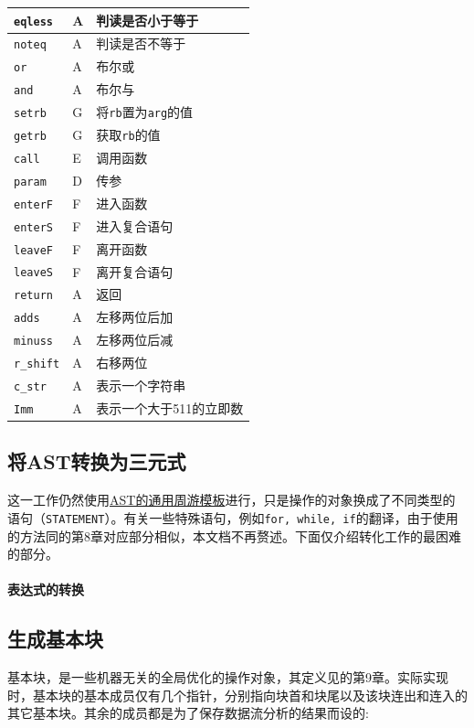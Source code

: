\begin{center}
\begin{minipage}{0.48\textwidth}
\begin{flushright}
\begin{tabular}{|l|l|l|}
	\hline
		\verb|eqless| & A & 判读是否小于等于\\
	\hline 
		\verb|noteq| & A & 判读是否不等于\\
	\hline 
		\verb|or| & A & 布尔或\\
	\hline 
		\verb|and| & A & 布尔与\\
	\hline 
		\verb|setrb| & G & 将\verb|rb|置为\verb|arg|的值\\
	\hline 
		\verb|getrb| & G & 获取\verb|rb|的值\\
	\hline 
		\verb|call| & E & 调用函数\\
	\hline 
		\verb|param| & D & 传参\\
	\hline 
		\verb|enterF| & F & 进入函数\\
	\hline 
		\verb|enterS| & F & 进入复合语句\\
	\hline 
		\verb|leaveF| & F & 离开函数\\
	\hline 
		\verb|leaveS| & F & 离开复合语句\\
	\hline 
		\verb|return| & A & 返回\\
	\hline
		\verb|adds| & A & 左移两位后加\\
	\hline
		\verb|minuss| & A & 左移两位后减\\
	\hline 
		\verb|r_shift| & A & 右移两位\\
	\hline 
		\verb|c_str| & A & 表示一个字符串\\
	\hline
		\verb|Imm| & A & 表示一个大于511的立即数\\
	\hline
	\end{tabular}
	\label{tab:}
\end{flushright}
\end{minipage}
\end{center}
\subsection{将AST转换为三元式}
这一工作仍然使用\hyperref[ASTtravesal]{AST的通用周游模板}进行，只是操作的对象换成了不同类型的语句（\verb|STATEMENT|）。有关一些特殊语句，例如\verb|for, while, if|的翻译，由于使用的方法同\cite{sunjiasu}的第8章对应部分相似，本文档不再赘述。下面仅介绍转化工作的最困难的部分。
\paragraph*{表达式的转换}
\label{ASTtotriple}
\subsection{生成基本块}
\label{basicblock}
基本块，是一些机器无关的全局优化的操作对象，其定义见\cite{sunjiasu}的第9章。实际实现时，基本块的基本成员仅有几个指针，分别指向块首和块尾以及该块连出和连入的其它基本块。其余的成员都是为了保存数据流分析的结果而设的:
\begin{enumerate}
	
\end{enumerate}


